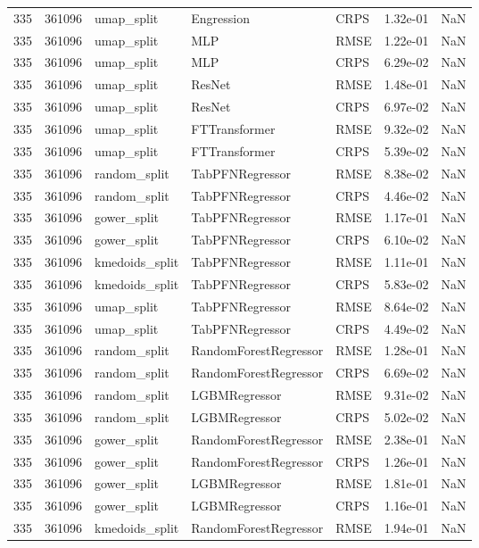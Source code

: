 \begin{tabular}{rrlllrr}
335 & 361096 & umap\_split & Engression & CRPS & 1.32e-01 & NaN \\
335 & 361096 & umap\_split & MLP & RMSE & 1.22e-01 & NaN \\
335 & 361096 & umap\_split & MLP & CRPS & 6.29e-02 & NaN \\
335 & 361096 & umap\_split & ResNet & RMSE & 1.48e-01 & NaN \\
335 & 361096 & umap\_split & ResNet & CRPS & 6.97e-02 & NaN \\
335 & 361096 & umap\_split & FTTransformer & RMSE & 9.32e-02 & NaN \\
335 & 361096 & umap\_split & FTTransformer & CRPS & 5.39e-02 & NaN \\
335 & 361096 & random\_split & TabPFNRegressor & RMSE & 8.38e-02 & NaN \\
335 & 361096 & random\_split & TabPFNRegressor & CRPS & 4.46e-02 & NaN \\
335 & 361096 & gower\_split & TabPFNRegressor & RMSE & 1.17e-01 & NaN \\
335 & 361096 & gower\_split & TabPFNRegressor & CRPS & 6.10e-02 & NaN \\
335 & 361096 & kmedoids\_split & TabPFNRegressor & RMSE & 1.11e-01 & NaN \\
335 & 361096 & kmedoids\_split & TabPFNRegressor & CRPS & 5.83e-02 & NaN \\
335 & 361096 & umap\_split & TabPFNRegressor & RMSE & 8.64e-02 & NaN \\
335 & 361096 & umap\_split & TabPFNRegressor & CRPS & 4.49e-02 & NaN \\
335 & 361096 & random\_split & RandomForestRegressor & RMSE & 1.28e-01 & NaN \\
335 & 361096 & random\_split & RandomForestRegressor & CRPS & 6.69e-02 & NaN \\
335 & 361096 & random\_split & LGBMRegressor & RMSE & 9.31e-02 & NaN \\
335 & 361096 & random\_split & LGBMRegressor & CRPS & 5.02e-02 & NaN \\
335 & 361096 & gower\_split & RandomForestRegressor & RMSE & 2.38e-01 & NaN \\
335 & 361096 & gower\_split & RandomForestRegressor & CRPS & 1.26e-01 & NaN \\
335 & 361096 & gower\_split & LGBMRegressor & RMSE & 1.81e-01 & NaN \\
335 & 361096 & gower\_split & LGBMRegressor & CRPS & 1.16e-01 & NaN \\
335 & 361096 & kmedoids\_split & RandomForestRegressor & RMSE & 1.94e-01 & NaN \\

\end{tabular}
